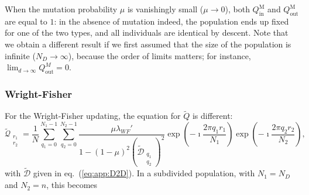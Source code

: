 \documentclass[11pt, letterpaper]{article}
\renewcommand{\eqref}[1]{\textup{{\normalfont eq.~(\ref{#1}}\normalfont)}}
\newcommand{\Moran}{\textrm{M}}
\newcommand{\inn}{\textrm{in}}
\newcommand{\out}{\textrm{out}}
\newcommand{\Qin}{Q_{\inn}}
\newcommand{\Qout}{Q_{\out}}
\newcommand{\ndemes}{N_D}
\begin{document}
When the mutation probability $\mu$ is vanishingly small ($\mu \to 0$), both $\Qin^{\Moran}$ and $\Qout^{\Moran}$ are equal to $1$: in the absence of mutation indeed, the population ends up fixed for one of the two types, and all individuals are identical by descent. Note that we obtain a different result if we first assumed that the size of the population is infinite ($\ndemes \to \infty$), because the order of limits matters; %
for instance, $\lim_{d\to \infty} \Qout^{M}=0$. 

\subsubsection{Wright-Fisher}
For the Wright-Fisher updating, the equation for $\tilde{Q}$ is different:
\begin{equation}
\tilde{\mathcal{Q}}_{\substack{r_1\\r_2}} = \frac{1}{N} \sum_{q_1=0}^{N_1-1} \sum_{q_2=0}^{N_2 -1} \frac{\mu \lambda_{WF}'}{1-(1-\mu)^2 (\tilde{\mathcal{D}}_{\substack{q_1\\q_2}})^2} \exp\left(-\imath \frac{2\pi q_1 r_1}{N_1}\right)\exp\left(-\imath \frac{2\pi q_2 r_2}{N_2}\right), 
\end{equation}
with $\tilde{\mathcal{D}}$ given in \eqref{eq:app:D2D}. In a subdivided population, with $N_1 = \ndemes$ and $N_2 = n$, this becomes
\end{document}

